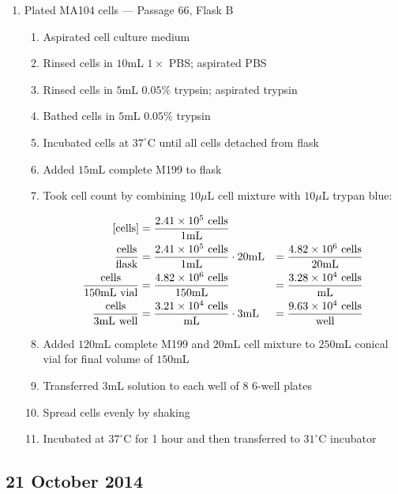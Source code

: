 \begin{enumerate}
	\item Plated MA104 cells --- Passage 66, Flask B
		\begin{enumerate}
			\item Aspirated cell culture medium
			\item Rinsed cells in $10$mL $1\times$ PBS; aspirated PBS
			\item Rinsed cells in $5$mL $0.05$\% trypsin; aspirated trypsin
			\item Bathed cells in $5$mL $0.05$\% trypsin
			\item Incubated cells at $37^{\circ}$C until all cells detached from flask
			\item Added $15$mL complete M199 to flask
			\item Took cell count by combining $10\mu$L cell mixture with $10\mu$L trypan blue:
			
				\begin{align*}
				\text{[cells]} &= \frac{2.41\times 10^{5}\text{ cells}}{1\text{mL}} \\
				\frac{\text{cells}}{\text{flask}} &= \frac{2.41\times 10^{5}\text{ cells}}{1\text{mL}} \cdot 20\text{mL} &= \frac{4.82\times 10^{6}\text{ cells}}{20\text{mL}}\\
				\frac{\text{cells}}{150\text{mL vial}} &= \frac{4.82\times 10^{6}\text{ cells}}{150\text{mL}} &= \frac{3.28\times 10^{4}\text{ cells}}{\text{mL}}\\
				\frac{\text{cells}}{3\text{mL well}} &= \frac{3.21\times 10^{4}\text{ cells}}{\text{mL}} \cdot 3\text{mL} &= \frac{9.63\times 10^{4}\text{ cells}}{\text{well}}\\
				\end{align*}
			\item Added $120$mL complete M199 and $20$mL cell mixture to $250$mL conical vial for final volume of $150$mL
			\item Transferred $3$mL solution to each well of 8 6-well plates
			\item Spread cells evenly by shaking
			\item Incubated at $37^{\circ}$C for 1 hour and then transferred to $31^{\circ}$C incubator
		\end{enumerate}
\end{enumerate}

\subsection*{21 October 2014}

